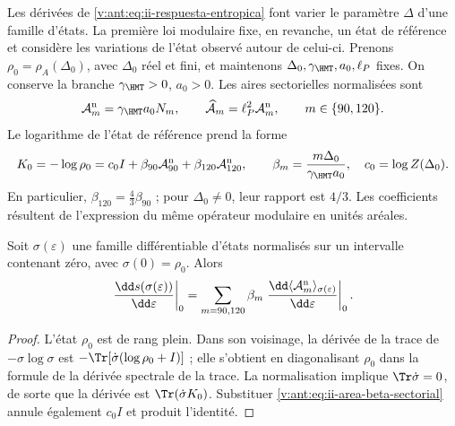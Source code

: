 Les dérivées de \eqref{v:ant:eq:ii-respuesta-entropica} font varier le paramètre
\(\Delta\) d’une famille d’états. La première loi modulaire fixe,
en revanche, un état de référence et considère les variations de l’état
observé autour de celui-ci. Prenons
\(\rho_0=\rho_A(\Delta_0)\), avec \(\Delta_0\) réel et fini,
et maintenons \(\Delta_0,\gamma_{\HMT},a_0,\ell_P\) fixes.
On conserve la branche \(\gamma_{\HMT}>0\), \(a_0>0\).
Les aires sectorielles normalisées sont
\begin{equation}
 \mathcal A_m^{\rm n}=\gamma_{\HMT}a_0N_m,
 \qquad
 \widehat{\mathcal A}_m=\ell_P^2\mathcal A_m^{\rm n},
 \qquad m\in\{90,120\}.
 \label{v:ant:eq:ii-area-sector-normalizado}
\end{equation}
Le logarithme de l'état de référence prend la forme
\begin{equation}
 K_0=-\log\rho_0
 =c_0I+\beta_{90}\mathcal A_{90}^{\rm n}
         +\beta_{120}\mathcal A_{120}^{\rm n},
 \qquad
 \beta_m=\frac{m\Delta_0}{\gamma_{\HMT}a_0},
 \quad c_0=\log Z(\Delta_0).
 \label{v:ant:eq:ii-area-beta-sectorial}
\end{equation}
En particulier, \(\beta_{120}=\tfrac43\beta_{90}\) ; pour
\(\Delta_0\ne0\), leur rapport est \(4/3\). Les coefficients
résultent de l'expression du même opérateur modulaire en unités aréales.

\begin{theorem}
\label{v:ant:thm:ii-area-primera-ley}
Soit \(\sigma(\varepsilon)\) une famille différentiable d’états
normalisés sur un intervalle contenant zéro, avec
\(\sigma(0)=\rho_0\). Alors
\begin{equation}
 \left.\frac{\dd s(\sigma(\varepsilon))}{\dd\varepsilon}\right|_0
 =\sum_{m=90,120}\beta_m
   \left.\frac{\dd\langle\mathcal A_m^{\rm n}\rangle_
                       {\sigma(\varepsilon)}}{\dd\varepsilon}\right|_0.
 \label{v:ant:eq:ii-area-primera-ley}
\end{equation}
\end{theorem}
\begin{proof}
L'état \(\rho_0\) est de rang plein. Dans son voisinage, la dérivée
de la trace de \(-\sigma\log\sigma\) est
\(-\Tr[\dot\sigma(\log\rho_0+I)]\) ; elle s'obtient en diagonalisant
\(\rho_0\) dans la formule de la dérivée spectrale de la trace.
La normalisation implique \(\Tr\dot\sigma=0\), de sorte que la
dérivée est \(\Tr(\dot\sigma K_0)\). Substituer
\eqref{v:ant:eq:ii-area-beta-sectorial} annule également \(c_0I\) et
produit l'identité.
\end{proof}


